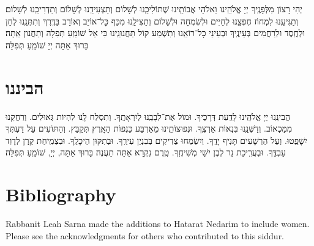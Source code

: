 \documentclass[twoside, openany, parskip=half, 11pt]{book}
\begin{document}
יְהִי רָצוֹן מִלְּפָנֶֽיךָ יְיָ אֱלֹהֵֽינוּ וֵאלֹהֵי אֲבוֹתֵֽינוּ שֶׁתּוֹלִיכֵֽנוּ לְשָׁלוֹם וְתַצְעִידֵֽנוּ לְשָׁלוֹם וְתַדְרִיכֵֽנוּ לְשָׁלוֹם׃ וְתַגִּיעֵֽנוּ לִמְחוֹז חֶפְצֵֽנוּ לְחַיִּים וּלְשִׂמְחָה וּלְשָׁלוֹם וְתַצִּילֵֽנוּ מִכַּף כׇּל־אוֹיֵב וְאוֹרֵב בַּדֶּֽרֶךְ וְתִתְּנֵֽנוּ לְחֵן וּלְחֶֽסֶד וּלְרַחֲמִים בְּעֵינֶֽיךָ וּבְעֵינֵי כׇל־רוֹאֵֽנוּ וְתִשְׁמַע קוֹל תַּחֲנוּנֵֽינוּ כִּי אֵל שׁוֹמֵֽעַ תְּפִלָה וְתַחֲנוּן אַֽתָּה׃ בָּרוּךְ אַתָּה יְיָ שׁוֹמֵֽעַ תְּפִלָּה׃\\

\chapter{הביננו}


הֲבִינֵֽנוּ יְיָ אֱלֹהֵֽינוּ לָדַֽעַת דְּרָכֶיךָ. וּמוֹל אֶת־לְבָבֵֽנוּ לְיִרְאָתֶֽךָ. וְתִסְלַח לָֽנוּ לִהְיוֹת גְּאוּלִים. וְרַחֲקֵנוּ מִמַּכְאוֹב. וְדַשְּׁנֵֽנוּ בִּנְאוֹת אַרְצֶֽךָ. וּנְפוּצוֹתֵֽינוּ מֵאַרְבַּע כַּנְפוֹת הָאָֽרֶץ תְּקַבֵּץ. וְהַתּוֹעִים עַל דַּעְתְּךָ יִשָׁפֵֽטוּ. וְעַל הַרְשָׁעִים תָּנִיף יָדֶֽךָ. וְיִשְׂמְחוּ צַדִיקִים בְּבִנְיַן עִירֶֽךָ. וּבְתִקּוּן הֵיכָלֶֽךָ. וּבִצְמִֽיחַת קֶֽרֶן לְדָוִד עַבְדֶּֽךָ. וּבְעֲרִֽיכַת נֵר לְבֶן יִשַׁי מְשִׁיחֶֽךָ. טֶֽרֶם נִקְרָא אַתָּה תַעֲנֶה׃ בָּרוּךְ אַתָּה, יְיָ, שׁוֹמֵֽעַ תְּפִלָּה׃

\chapter{Bibliography}
\begin{english}
\nocite{artcant}
\nocite{artscroll}
\nocite{avodasyisroel}
\nocite{birnbaum}
\nocite{korenyt}
\nocite{mapm}
\nocite{olastamid}
\nocite{levshalem}
\nocite{sacks_koren_2016}
\nocite{simshalom}
\nocite{simshalomweekday}
\nocite{tefillatyesharim}
\nocite{birkat_haminim}

\printbibliography
Rabbanit Leah Sarna made the additions to Hatarat Nedarim to include women. Please see the acknowledgments for others who contributed to this siddur.

\end{english}

\end{document}
